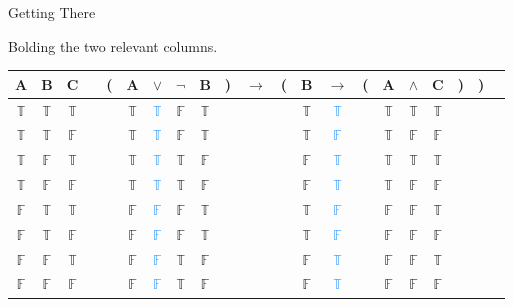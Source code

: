\documentclass[
  ignorenonframetext,
]{beamer}
\renewcommand{\,}{\text{, }}
\def\True{\mathbb{T}}
\def\False{\mathbb{F}}
\begin{document}
\begin{frame}{Getting There}
\protect\hypertarget{getting-there}{}

Bolding the two relevant columns.
\begin{center} \begin{tabular}{@{ }c@{ }@{ }c@{ }@{ }c | c@{ }@{}c@{}@{ }c@{ }@{ }c@{ }@{ }c@{ }@{ }c@{ }@{}c@{}@{ }c@{ }@{}c@{}@{ }c@{ }@{ }c@{ }@{}c@{}@{ }c@{ }@{ }c@{ }@{ }c@{ }@{}c@{}@{}c@{}@{ }c} A & B & C &  & ( & A & $\vee$ & $\neg$ & B & ) & $\rightarrow$ & ( & B & $\rightarrow$ & ( & A & $\wedge$ & C & ) & ) & \\ \hline   $\True$ & $\True$ & $\True$ &  &  & $\True$ & \textcolor{dodgerblue}{$\True$} & $\False$ & $\True$ &  &&  & $\True$ & \textcolor{dodgerblue}{$\True$} &  & $\True$ & $\True$ & $\True$ &  &  & \\  $\True$ & $\True$ & $\False$ &  &  & $\True$ & \textcolor{dodgerblue}{$\True$} & $\False$ & $\True$ &  &&  & $\True$ & \textcolor{dodgerblue}{$\False$} &  & $\True$ & $\False$ & $\False$ &  &  & \\  $\True$ & $\False$ & $\True$ &  &  & $\True$ & \textcolor{dodgerblue}{$\True$} & $\True$ & $\False$ &  &&  & $\False$ & \textcolor{dodgerblue}{$\True$} &  & $\True$ & $\True$ & $\True$ &  &  & \\  $\True$ & $\False$ & $\False$ &  &  & $\True$ & \textcolor{dodgerblue}{$\True$} & $\True$ & $\False$ &  &&  & $\False$ & \textcolor{dodgerblue}{$\True$} &  & $\True$ & $\False$ & $\False$ &  &  & \\  $\False$ & $\True$ & $\True$ &  &  & $\False$ & \textcolor{dodgerblue}{$\False$} & $\False$ & $\True$ &  &&  & $\True$ & \textcolor{dodgerblue}{$\False$} &  & $\False$ & $\False$ & $\True$ &  &  & \\  $\False$ & $\True$ & $\False$ &  &  & $\False$ & \textcolor{dodgerblue}{$\False$} & $\False$ & $\True$ &  &&  & $\True$ & \textcolor{dodgerblue}{$\False$} &  & $\False$ & $\False$ & $\False$ &  &  & \\  $\False$ & $\False$ & $\True$ &  &  & $\False$ & \textcolor{dodgerblue}{$\False$} & $\True$ & $\False$ &  &&  & $\False$ & \textcolor{dodgerblue}{$\True$} &  & $\False$ & $\False$ & $\True$ &  &  & \\  $\False$ & $\False$ & $\False$ &  &  & $\False$ & \textcolor{dodgerblue}{$\False$} & $\True$ & $\False$ &  &&  & $\False$ & \textcolor{dodgerblue}{$\True$} &  & $\False$ & $\False$ & $\False$ &  &  & \\ \end{tabular} \end{center}

\end{frame}
\end{document}
